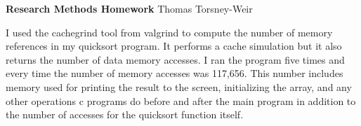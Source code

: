 \documentclass[10pt]{article}
\begin{document}
{\bf Research Methods Homework} \hfill {\raggedleft Thomas Torsney-Weir}

I used the cachegrind tool from valgrind to compute the number of memory
references in my quicksort program.  It performs a cache simulation but 
it also returns the number of data memory accesses.  I ran the program
five times and every time the number of memory accesses was 117,656.  This
number includes memory used for printing the result to the screen, 
initializing the array, and any other operations c programs do before and 
after the main program in addition to the number of accesses for the quicksort
function itself.
\end{document}

